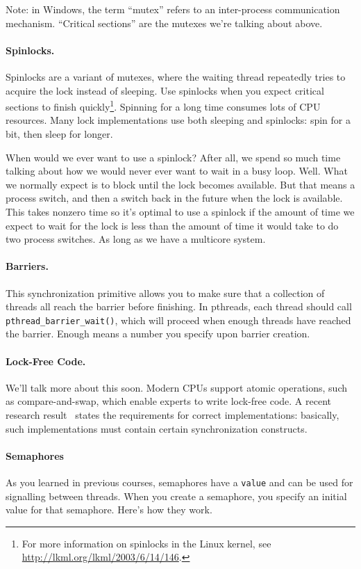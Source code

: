 \documentclass[a4paper]{report}
\begin{document}
Note: in Windows, the term ``mutex'' refers to an inter-process
communication mechanism. ``Critical sections'' are the mutexes we're
talking about above.

\paragraph{Spinlocks.} Spinlocks are a variant of mutexes, where the
waiting thread repeatedly tries to acquire the lock instead of sleeping.
Use spinlocks when you expect critical sections to finish 
quickly\footnote{For more information on spinlocks in the Linux
kernel, see \url{http://lkml.org/lkml/2003/6/14/146}.}. Spinning
for a long time consumes lots of CPU resources. Many lock
implementations use both sleeping and spinlocks: spin for a bit,
then sleep for longer. 

When would we ever want to use a spinlock? After all, we spend so much time talking about how we would never ever want to wait in a busy loop. Well. What we normally expect is to block until the lock becomes available. But that means a process switch, and then a switch back in the future when the lock is available. This takes nonzero time so it's optimal to use a spinlock if the amount of time we expect to wait for the lock is less than the amount of time it would take to do two process switches. As long as we have a multicore system.


\paragraph{Barriers.} This synchronization primitive allows you 
to make sure that a collection of threads all reach the
barrier before finishing. In pthreads, each thread should call
\verb+pthread_barrier_wait()+, which will proceed when enough threads
have reached the barrier. Enough means a number you specify upon
barrier creation.

\paragraph{Lock-Free Code.} We'll talk more about this soon.
Modern CPUs support atomic operations, such as compare-and-swap, which
enable experts to write lock-free code. A recent research 
result~\cite{mckenney11:_concur,Attiya:2011:LOE:1926385.1926442} states the requirements for correct implementations: basically,
such implementations must contain certain synchronization constructs.

\paragraph{Semaphores}
As you learned in previous courses, semaphores have a {\tt value} and
can be used for signalling between threads. When you create a semaphore,
you specify an initial value for that semaphore. Here's how they work.
\end{document}
